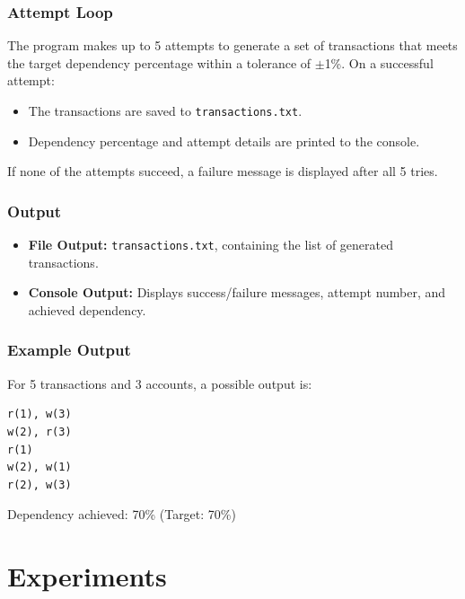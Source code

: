 \documentclass[12pt]{article}
\begin{document}
\subsubsection*{Attempt Loop}
The program makes up to 5 attempts to generate a set of transactions that meets the target dependency percentage within a tolerance of $\pm$1\%. On a successful attempt:
\begin{itemize}
    \item The transactions are saved to \texttt{transactions.txt}.
    \item Dependency percentage and attempt details are printed to the console.
\end{itemize}

If none of the attempts succeed, a failure message is displayed after all 5 tries.

\subsubsection*{Output}
\begin{itemize}
    \item \textbf{File Output:} \texttt{transactions.txt}, containing the list of generated transactions.
    \item \textbf{Console Output:} Displays success/failure messages, attempt number, and achieved dependency.
\end{itemize}

\subsubsection*{Example Output}
For 5 transactions and 3 accounts, a possible output is:
\begin{verbatim}
r(1), w(3)
w(2), r(3)
r(1)
w(2), w(1)
r(2), w(3)
\end{verbatim}

Dependency achieved: 70\% (Target: 70\%)


\section{Experiments}
\end{document}
